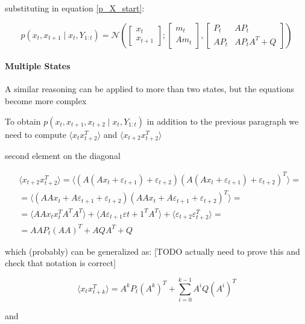\documentclass{article}
\newcommand{\E}[1]{\langle #1 \rangle} %
\newcommand{\norm}[3]{\mathcal{N}\left(#1; #2, #3\right)}
\begin{document}
substituting in equation \ref{p_X_start}:

\begin{equation}\label{p_X_final}
p(x_t, x_{t+1}\mid x_t, Y_{1:t}) = \norm{\begin{bmatrix}x_t\\x_{t+1}\end{bmatrix}}{\begin{bmatrix}m_t\\Am_t\end{bmatrix}}
{\begin{bmatrix}P_t & AP_t\\AP_t & AP_tA^T + Q\end{bmatrix}}
\end{equation}

\paragraph{Multiple States} A similar reasoning can be applied to more than two states, but the equations become more complex

To obtain $p(x_t, x_{t+1}, x_{t+2} \mid x_t, Y_{1:t})$ in addition to the previous paragraph we need to compute $\E{x_tx_{t+2}^T}$ and $\E{x_{t+2}x_{t+2}^T}$

second element on the diagonal

\begin{equation}\label{eq:cov_x_t_x_t2}
\begin{split}
    &\E{x_{t+2}x_{t+2}^T} = \E{(A(Ax_t + \varepsilon_{t+1}) + \varepsilon_{t+2})(A(Ax_t + \varepsilon_{t+1}) + \varepsilon_{t+2})^T} =\\
    &=\E{(AAx_t + A\varepsilon_{t+1} + \varepsilon_{t+2})(AAx_t + A\varepsilon_{t+1} + \varepsilon_{t+2})^T}=\\
    &=\E{AAx_tx_t^TA^TA^T} + \E{A\varepsilon_{t+1}\varepsilon{t+1}^TA^T} + \E{\varepsilon_{t+2}\varepsilon_{t+2}^T}=\\
    &=AAP_t(AA)^T + AQA^T + Q
\end{split}
\end{equation}

which (probably) can be generalized as: [TODO actually need to prove this and check that notation is correct]

\begin{equation}
    \E{x_tx_{t+k}^T} = A^kP_t(A^k)^T + \sum_{i=0}^{k-1} A^iQ(A^i)^T
\end{equation}

and 
\end{document}
